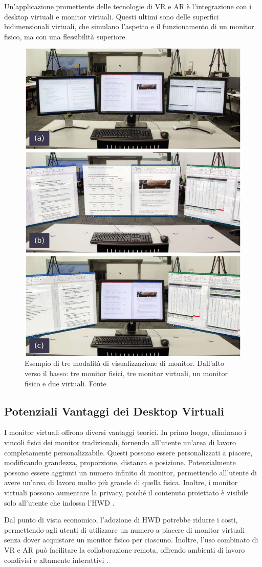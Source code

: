 \documentclass[12pt,a4paper,openright,twoside]{book}
\begin{document}
Un'applicazione promettente delle tecnologie di VR e AR è l'integrazione con i desktop virtuali e monitor virtuali. Questi ultimi sono delle superfici bidimensionali virtuali, che simulano l'aspetto e il funzionamento di un monitor fisico, ma con una flessibilità superiore\cite{pavanatto2021, frontiers2023}.
\begin{figure}
    \centering
    \includegraphics[width=.4\linewidth]{figures/virtual_monitors.jpg}
    \caption[xarch]{Esempio di tre modalità di visualizzazione di monitor. Dall'alto verso il basso: tre monitor fisici, tre monitor virtuali, un monitor fisico e due virtuali. Fonte \cite{pavanatto2021}}
\end{figure}

\subsection{Potenziali Vantaggi dei Desktop Virtuali}

I monitor virtuali offrono diversi vantaggi teorici. In primo luogo, eliminano i vincoli fisici dei monitor tradizionali, fornendo all'utente un'area di lavoro completamente personalizzabile. Questi possono essere personalizzati a piacere, modificando grandezza, proporzione, distanza e posizione. Potenzialmente possono essere aggiunti un numero infinito di monitor, permettendo all'utente di avere un'area di lavoro molto più grande di quella fisica. Inoltre, i monitor virtuali possono aumentare la privacy, poiché il contenuto proiettato è visibile solo all'utente che indossa l'HWD \cite{pavanatto2021}.

Dal punto di vista economico, l'adozione di HWD potrebbe ridurre i costi, permettendo agli utenti di utilizzare un numero a piacere di monitor virtuali senza dover acquistare un monitor fisico per ciascuno. Inoltre, l'uso combinato di VR e AR può facilitare la collaborazione remota, offrendo ambienti di lavoro condivisi e altamente interattivi \cite{frontiers2023}.
\end{document}
